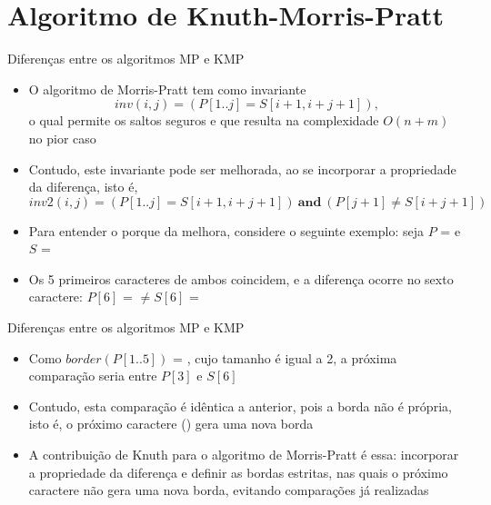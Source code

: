 \section{Algoritmo de Knuth-Morris-Pratt}


\begin{frame}[fragile]{Diferenças entre os algoritmos MP e KMP}

    \begin{itemize}
        \item O algoritmo de Morris-Pratt tem como invariante
        \[
            inv(i, j) = (P[1..j] = S[i + 1, i + j + 1]),
        \]
        o qual permite os saltos seguros e que resulta na complexidade $O(n + m)$ no pior caso

        \item Contudo, este invariante pode ser melhorada, ao se incorporar a propriedade da 
        diferença, isto é,
        \[
            inv2(i, j) = (P[1..j] = S[i + 1, i + j + 1])\ \mathbf{and}\ (P[j + 1] \neq S[i + j + 1])
        \]

        \item Para entender o porque da melhora, considere o seguinte exemplo: seja 
            $P$ =  e $S$ = 

        \item Os 5 primeiros caracteres de ambos coincidem, e a diferença ocorre no sexto 
            caractere: $P[6]$ =  $\neq S[6]$ = 

    \end{itemize}

\end{frame}

\begin{frame}[fragile]{Diferenças entre os algoritmos MP e KMP}

    \begin{itemize}
        \item Como $border(P[1..5])$ = , cujo tamanho é igual a 2, a próxima 
            comparação seria entre $P[3]$ e $S[6]$

        \item Contudo, esta comparação é idêntica a anterior, pois a borda  não é 
            própria, isto é, o próximo caractere () gera uma nova borda 

        \item A contribuição de Knuth para o algoritmo de Morris-Pratt é essa: incorporar a 
            propriedade da diferença e definir as bordas estritas, nas quais o próximo caractere 
            não gera uma nova borda, evitando comparações já realizadas
    \end{itemize}

\end{frame}


